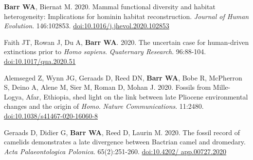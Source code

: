 



\item {\bfseries Barr WA}, Biernat M. 2020. Mammal functional diversity and habitat heterogeneity: Implications for hominin habitat reconstruction. \emph{Journal of Human Evolution}. 146:102853. \href{https::/dx.doi.org/10.1016/j.jhevol.2020.102853}{doi:10.1016/j.jhevol.2020.102853}

\item Faith JT, Rowan J, Du A, {\bfseries Barr WA}. 2020. The uncertain case for human-driven extinctions prior to \emph{Homo sapiens}. \emph{Quaternary Research}. 96:88-104. \href{https://dx.doi.org/10.1017/qua.2020.51}{doi:10.1017/qua.2020.51}

\item Alemseged Z, Wynn JG, Geraads D, Reed DN, {\bfseries Barr WA}, Bobe R, McPherron S, Deino A, Alene M, Sier M, Roman D,  Mohan J. 2020. Fossils from Mille-Logya, Afar, Ethiopia, shed light on the link between late Pliocene environmental changes and the origin of \emph{Homo}. \emph{Nature Communications}. 11:2480. \href{https://doi.org/10.1038/s41467-020-16060-8 }{doi:10.1038/s41467-020-16060-8}

\item Geraads D, Didier G, {\bfseries Barr WA}, Reed D, Laurin M. 2020. The fossil record of camelids demonstrates a late divergence between Bactrian camel and dromedary. \emph{Acta Palaeontologica Polonica}. 65(2):251-260. \href{https://doi.org/10.4202/app.00727.2020}{doi:10.4202/ app.00727.2020}

